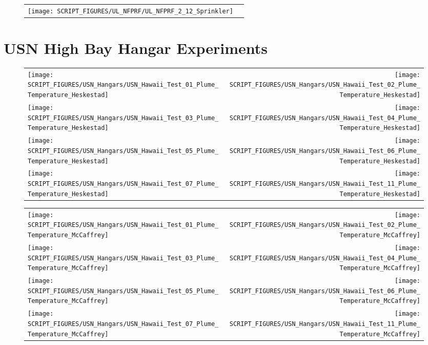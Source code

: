 \begin{figure}[!ht]
\begin{tabular*}{\textwidth}{l@{\extracolsep{\fill}}r}
\texttt{[image: SCRIPT\_FIGURES/UL\_NFPRF/UL\_NFPRF\_2\_12\_Sprinkler]}
\end{tabular*}
\end{figure}

\clearpage

\section{USN High Bay Hangar Experiments}

\begin{figure}[!ht]
\begin{tabular*}{\textwidth}{l@{\extracolsep{\fill}}r}
\texttt{[image: SCRIPT\_FIGURES/USN\_Hangars/USN\_Hawaii\_Test\_01\_Plume\_Temperature\_Heskestad]} &
\texttt{[image: SCRIPT\_FIGURES/USN\_Hangars/USN\_Hawaii\_Test\_02\_Plume\_Temperature\_Heskestad]} \\
\texttt{[image: SCRIPT\_FIGURES/USN\_Hangars/USN\_Hawaii\_Test\_03\_Plume\_Temperature\_Heskestad]} &
\texttt{[image: SCRIPT\_FIGURES/USN\_Hangars/USN\_Hawaii\_Test\_04\_Plume\_Temperature\_Heskestad]} \\
\texttt{[image: SCRIPT\_FIGURES/USN\_Hangars/USN\_Hawaii\_Test\_05\_Plume\_Temperature\_Heskestad]} &
\texttt{[image: SCRIPT\_FIGURES/USN\_Hangars/USN\_Hawaii\_Test\_06\_Plume\_Temperature\_Heskestad]} \\
\texttt{[image: SCRIPT\_FIGURES/USN\_Hangars/USN\_Hawaii\_Test\_07\_Plume\_Temperature\_Heskestad]} &
\texttt{[image: SCRIPT\_FIGURES/USN\_Hangars/USN\_Hawaii\_Test\_11\_Plume\_Temperature\_Heskestad]}
\end{tabular*}
\end{figure}

\begin{figure}[!ht]
\begin{tabular*}{\textwidth}{l@{\extracolsep{\fill}}r}
\texttt{[image: SCRIPT\_FIGURES/USN\_Hangars/USN\_Hawaii\_Test\_01\_Plume\_Temperature\_McCaffrey]} &
\texttt{[image: SCRIPT\_FIGURES/USN\_Hangars/USN\_Hawaii\_Test\_02\_Plume\_Temperature\_McCaffrey]} \\
\texttt{[image: SCRIPT\_FIGURES/USN\_Hangars/USN\_Hawaii\_Test\_03\_Plume\_Temperature\_McCaffrey]} &
\texttt{[image: SCRIPT\_FIGURES/USN\_Hangars/USN\_Hawaii\_Test\_04\_Plume\_Temperature\_McCaffrey]} \\
\texttt{[image: SCRIPT\_FIGURES/USN\_Hangars/USN\_Hawaii\_Test\_05\_Plume\_Temperature\_McCaffrey]} &
\texttt{[image: SCRIPT\_FIGURES/USN\_Hangars/USN\_Hawaii\_Test\_06\_Plume\_Temperature\_McCaffrey]} \\
\texttt{[image: SCRIPT\_FIGURES/USN\_Hangars/USN\_Hawaii\_Test\_07\_Plume\_Temperature\_McCaffrey]} &
\texttt{[image: SCRIPT\_FIGURES/USN\_Hangars/USN\_Hawaii\_Test\_11\_Plume\_Temperature\_McCaffrey]}
\end{tabular*}
\end{figure}

